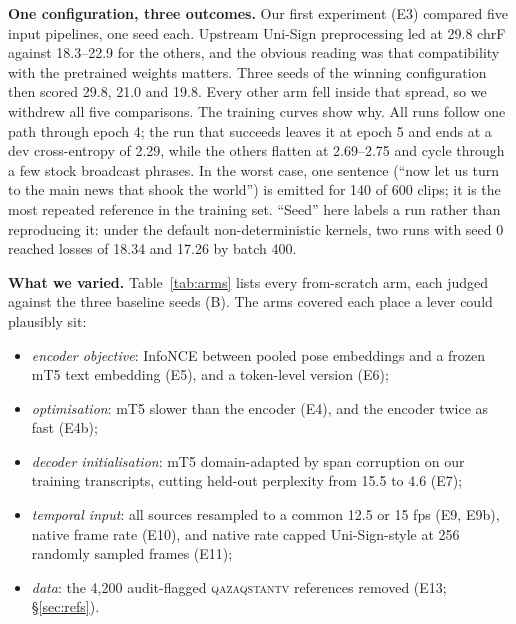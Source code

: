 \documentclass[11pt,twocolumn,a4paper]{article}
\newcommand{\src}[1]{\textsc{#1}}
\newcommand{\qz}{\src{qazaqstantv}}
\renewcommand{\paragraph}[1]{\par\smallskip\noindent\textbf{#1}\hspace{0.5em}}
\begin{document}
\paragraph{One configuration, three outcomes.}
Our first experiment (E3) compared five input pipelines, one seed each. Upstream Uni-Sign preprocessing led at 29.8 chrF against 18.3--22.9 for the others, and the obvious reading was that compatibility with the pretrained weights matters. Three seeds of the winning configuration then scored 29.8, 21.0 and 19.8. Every other arm fell inside that spread, so we withdrew all five comparisons. The training curves show why. All runs follow one path through epoch 4; the run that succeeds leaves it at epoch 5 and ends at a dev cross-entropy of 2.29, while the others flatten at 2.69--2.75 and cycle through a few stock broadcast phrases. In the worst case, one sentence (``now let us turn to the main news that shook the world'') is emitted for 140 of 600 clips; it is the most repeated reference in the training set. ``Seed'' here labels a run rather than reproducing it: under the default non-deterministic kernels, two runs with seed 0 reached losses of 18.34 and 17.26 by batch 400.

\paragraph{What we varied.}
Table~\ref{tab:arms} lists every from-scratch arm, each judged against the three baseline seeds (B). The arms covered each place a lever could plausibly sit:
\begin{itemize}[leftmargin=*,itemsep=1pt,topsep=2pt]
\item \emph{encoder objective}: InfoNCE \citep{oord2018cpc} between pooled pose embeddings and a frozen mT5 text embedding (E5), and a token-level version (E6);
\item \emph{optimisation}: mT5 slower than the encoder (E4), and the encoder twice as fast (E4b);
\item \emph{decoder initialisation}: mT5 domain-adapted by span corruption \citep{raffel2020t5} on our training transcripts, cutting held-out perplexity from 15.5 to 4.6 (E7);
\item \emph{temporal input}: all sources resampled to a common 12.5 or 15 fps (E9, E9b), native frame rate (E10), and native rate capped Uni-Sign-style at 256 randomly sampled frames (E11);
\item \emph{data}: the 4{,}200 audit-flagged \qz{} references removed (E13; \S\ref{sec:refs}).
\end{itemize}
\end{document}
